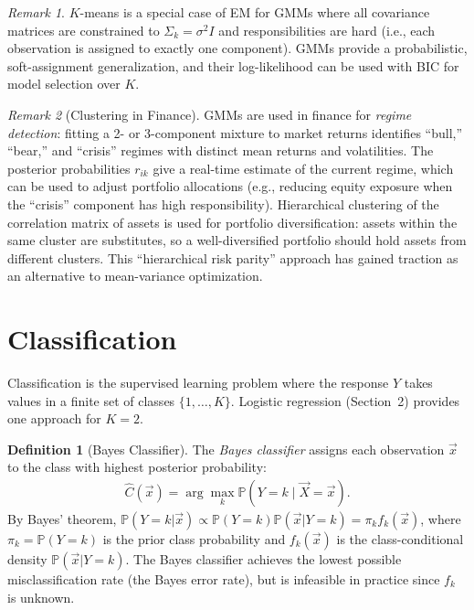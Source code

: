 \documentclass[11pt]{article}
\theoremstyle{definition}
\newtheorem{definition}{Definition}[section]
\theoremstyle{plain}
\theoremstyle{remark}
\newtheorem{remark}{Remark}[section]
\begin{document}
\begin{remark}
    $K$-means is a special case of EM for GMMs where all covariance matrices are constrained to $\Sigma_k = \sigma^2 I$ and responsibilities are hard (i.e., each observation is assigned to exactly one component). GMMs provide a probabilistic, soft-assignment generalization, and their log-likelihood can be used with BIC for model selection over $K$.
\end{remark}

\begin{remark}[Clustering in Finance]
    GMMs are used in finance for \emph{regime detection}: fitting a 2- or 3-component mixture to market returns identifies ``bull,'' ``bear,'' and ``crisis'' regimes with distinct mean returns and volatilities. The posterior probabilities $r_{ik}$ give a real-time estimate of the current regime, which can be used to adjust portfolio allocations (e.g., reducing equity exposure when the ``crisis'' component has high responsibility). Hierarchical clustering of the correlation matrix of assets is used for portfolio diversification: assets within the same cluster are substitutes, so a well-diversified portfolio should hold assets from different clusters. This ``hierarchical risk parity'' approach has gained traction as an alternative to mean-variance optimization.
\end{remark}

\section{Classification}

Classification is the supervised learning problem where the response $Y$ takes values in a finite set of classes $\{1,\dots,K\}$. Logistic regression (Section~2) provides one approach for $K=2$.

\begin{definition}[Bayes Classifier]
    The \textit{Bayes classifier} assigns each observation $\vec{x}$ to the class with highest posterior probability:
    \begin{align}
        \hat{C}(\vec{x}) = \arg\max_k \mathbb{P}(Y = k \mid \vec{X} = \vec{x}).
    \end{align}
    By Bayes' theorem, $\mathbb{P}(Y=k|\vec{x}) \propto \mathbb{P}(Y=k)\mathbb{P}(\vec{x}|Y=k)=\pi_k f_k(\vec{x})$, where $\pi_k = \mathbb{P}(Y=k)$ is the prior class probability and $f_k(\vec{x})$ is the class-conditional density $\mathbb{P}(\vec{x}|Y=k)$. The Bayes classifier achieves the lowest possible misclassification rate (the Bayes error rate), but is infeasible in practice since $f_k$ is unknown.
\end{definition}
\end{document}
